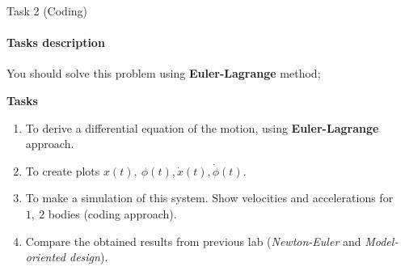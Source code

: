 \documentclass[aspectratio=169]{beamer}
\newcommand{\fbckg}[1]{\usebackgroundtemplate{\texttt{[image: \#1]}}}%
\begin{document}
  \begin{frame}[t]{Task 2 (Coding)}
    \framesubtitle{Tasks description}
          \footnotesize
          \vspace{-0.4cm}
          You should solve this problem using \textbf{Euler-Lagrange} method;

          \textbf{Tasks}
          \begin{enumerate}
            \item To derive a differential equation of the motion, using \textbf{Euler-Lagrange} approach.
            \item To create plots $x(t),\ \phi(t), \dot{x}(t), \dot{\phi}(t)$. 
            \item To make a simulation of this system. Show velocities and accelerations for $1,\ 2$ bodies (coding approach).
            \item Compare the obtained results from previous lab (\textit{Newton-Euler} and \textit{Model-oriented design}).
          \end{enumerate}
    \end{frame}

\fbckg{fibeamer/figs/last_page.png}
\frame[plain]{}
\end{document}
